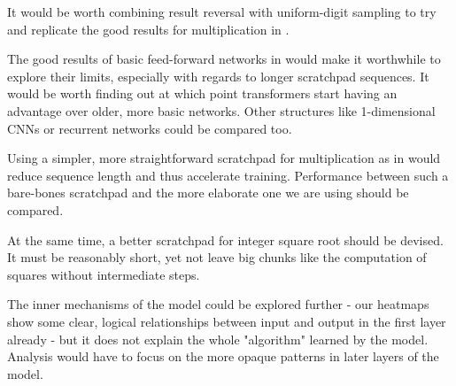 It would be worth combining result reversal with uniform-digit sampling to try and replicate the good  results for multiplication in \cite{positionmatters}.

The good results of basic feed-forward networks in \cite{visual} would make it worthwhile to explore their limits, especially with regards to longer scratchpad sequences. It would be worth finding out at which point transformers start having an advantage over older, more basic networks. Other structures like 1-dimensional CNNs or recurrent networks could be compared too.

Using a simpler, more straightforward scratchpad for multiplication as in \cite{implicit} would reduce sequence length and thus accelerate training. Performance between such a bare-bones scratchpad and the more elaborate one we are using should be compared.

At the same time, a better scratchpad for integer square root should be devised. It must be reasonably short, yet not leave big chunks like the computation of squares without intermediate steps.

The inner mechanisms of the model could be explored further - our heatmaps show some clear, logical relationships between input and output in the first layer already - but it does not explain the whole "algorithm" learned by the model. Analysis would have to focus on the more opaque patterns in later layers of the model.
